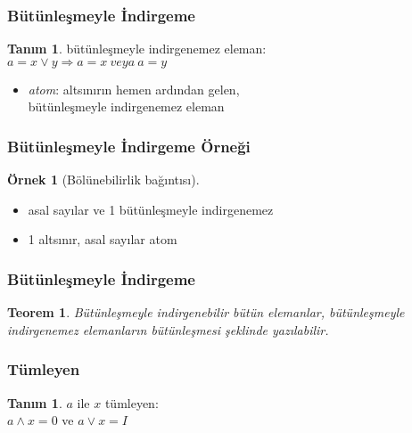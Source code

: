 \documentclass[dvipsnames]{beamer}
\theoremstyle{definition}
\newtheorem{tanim}[theorem]{Tanım}
\theoremstyle{example}
\newtheorem{ornek}[theorem]{Örnek}
\theoremstyle{plain}
\newtheorem{teorem}[theorem]{Teorem}
\begin{document}
\begin{frame}
  \frametitle{Bütünleşmeyle İndirgeme}

  \begin{tanim}
    \alert{bütünleşmeyle indirgenemez eleman}:\\
    $a = x \vee y \Rightarrow a = x ~veya~ a = y$
  \end{tanim}

  \pause
  \medskip
  \begin{itemize}
    \item \emph{atom}: altsınırın hemen ardından gelen,\\
      bütünleşmeyle indirgenemez eleman
  \end{itemize}
\end{frame}

\begin{frame}
  \frametitle{Bütünleşmeyle İndirgeme Örneği}

  \begin{ornek}[Bölünebilirlik bağıntısı]
    \begin{itemize}
      \item asal sayılar ve 1 bütünleşmeyle indirgenemez

      \pause
      \medskip
      \item 1 altsınır, asal sayılar atom
    \end{itemize}
  \end{ornek}
\end{frame}

\begin{frame}
  \frametitle{Bütünleşmeyle İndirgeme}

  \begin{teorem}
    Bütünleşmeyle indirgenebilir bütün elemanlar, bütünleşmeyle indirgenemez
    elemanların bütünleşmesi şeklinde yazılabilir.
  \end{teorem}
\end{frame}

\begin{frame}
  \frametitle{Tümleyen}

  \begin{tanim}
    $a$ ile $x$ \alert{tümleyen}:\\
    $a \wedge x = 0$ ve $a \vee x = I$
  \end{tanim}
\end{frame}
\end{document}

